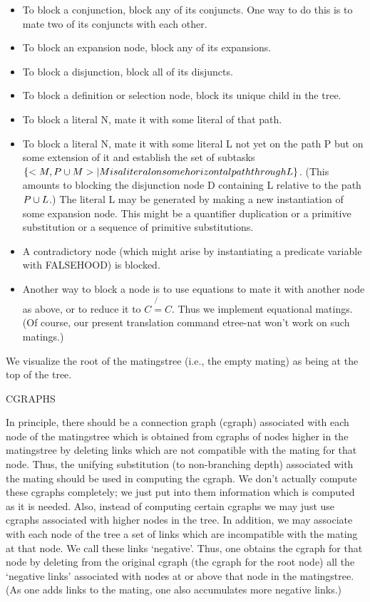 \begin{itemize}
\item To block a conjunction, block any of its conjuncts.
One way to do this is to mate two of its conjuncts with each other.

\item To block an expansion node, block any of its expansions.

\item To block a disjunction, block all of its disjuncts.

\item To block a definition or selection node, block its
unique child in the tree.

\item To block a literal N, mate it with some literal of that path.

\item To block a literal N, mate it with some literal L not yet on the
path P but on some extension of it
and establish the set of subtasks
$\{<M, P \cup{M}> | M is a literal on some horizontal path through L\}$.
(This amounts to blocking the disjunction node D  containing L
relative to the path $P \cup{L}$.) The literal L may be generated
by making a new instantiation of some expansion node.
This might be a quantifier duplication or a primitive substitution
or a sequence of primitive substitutions.

\item A contradictory node (which might arise by instantiating a
predicate variable with FALSEHOOD) is blocked.

\item Another way to block a node is to use equations to mate it
with another node as above, or to reduce it to $ \not{ C = C}$.
Thus we implement equational matings. (Of course, our present
translation command etree-nat won't work on such matings.)

\end{itemize}

We visualize the root of the matingstree (i.e., the empty mating)
as being at the top of the tree.

CGRAPHS

In principle, there should be a connection graph (cgraph)
associated with each node of the matingstree which is obtained from
cgraphs of nodes higher in the matingstree by deleting links which are
not compatible with the mating for that node. Thus, the unifying
substitution (to non-branching depth) associated with the mating
should be used in computing the cgraph.  We don't actually compute
these cgraphs completely; we just put into them information which is
computed as it is needed. Also, instead of computing certain cgraphs
we may just use cgraphs associated with higher nodes in the tree.
In addition, we may associate with each node of the tree
a set of links which are incompatible with the mating at that node.
We call these links `negative'.
Thus, one obtains the cgraph for that node by deleting from the
original cgraph (the cgraph for the root node) all the `negative
links' associated with nodes at or above that node in the matingstree.
(As one adds links to the mating, one also accumulates more negative
links.)

